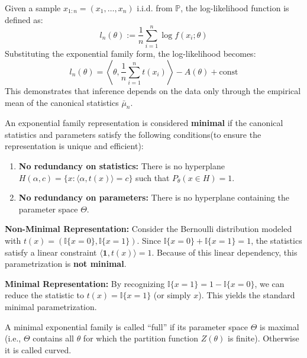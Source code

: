 \begin{remark}
    Given a sample $x_{1:n} = (x_1, \dots, x_n)$ i.i.d. from $\mathbb{P}$, the log-likelihood function is defined as:
\begin{equation*}
    l_n(\theta) := \frac{1}{n} \sum_{i=1}^{n} \log f(x_i; \theta)
\end{equation*}
Substituting the exponential family form, the log-likelihood becomes:
\begin{equation*}
    l_n(\theta) = \left\langle \theta, \frac{1}{n}\sum_{i=1}^{n}t(x_i) \right\rangle - A(\theta) + \text{const}
\end{equation*}
This demonstrates that inference depends on the data only through the empirical mean of the canonical statistics $\bar{\mu}_n$.
\end{remark}

\begin{de}
    An exponential family representation is considered \textbf{minimal} if the canonical statistics and parameters satisfy the following conditions(to ensure the representation is unique and efficient):
    \begin{enumerate}
    \item \textbf{No redundancy on statistics:} There is no hyperplane $H(\alpha, c) = \{x : \langle \alpha, t(x) \rangle = c\}$ such that $P_\theta(x \in H) = 1$.
    \item \textbf{No redundancy on parameters:} There is no hyperplane containing the parameter space $\Theta$.
\end{enumerate}
\end{de}
\begin{eg}
    \textbf{Non-Minimal Representation:}
Consider the Bernoulli distribution modeled with $t(x) = (\mathbb{I}\{x=0\}, \mathbb{I}\{x=1\})$.
Since $\mathbb{I}\{x=0\} + \mathbb{I}\{x=1\} = 1$, the statistics satisfy a linear constraint $\langle \mathbf{1}, t(x) \rangle = 1$. Because of this linear dependency, this parametrization is \textbf{not minimal}.

\textbf{Minimal Representation:}
By recognizing $\mathbb{I}\{x=1\} = 1 - \mathbb{I}\{x=0\}$, we can reduce the statistic to $t(x) = \mathbb{I}\{x=1\}$ (or simply $x$). This yields the standard minimal parametrization.
\end{eg}


\begin{de}
    A minimal exponential family is called ``full'' if its parameter space $\Theta$ is maximal (i.e., $\Theta$ contains all $\theta$ for which the partition function $Z(\theta)$ is finite). Otherwise it is called curved.
\end{de}

